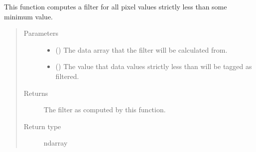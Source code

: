 \documentclass[letterpaper,10pt,english]{sphinxmanual}
\begin{document}
\begin{fulllineitems}
\label{\detokenize{docstrings/ifa_smeargle.masking.filters:ifa_smeargle.masking.filters.filter_minimum_value}}
This function computes a filter for all pixel values
strictly less than some minimum value.
\begin{quote}\begin{description}
\item[{Parameters}] \leavevmode\begin{itemize}
\item {} 
 () \textendash{} The data array that the filter will be calculated from.

\item {} 
 () \textendash{} The value that data values strictly less than will be
tagged as filtered.

\end{itemize}

\item[{Returns}] \leavevmode
{} \textendash{} The filter as computed by this function.

\item[{Return type}] \leavevmode
ndarray

\end{description}\end{quote}

\end{fulllineitems}

\end{document}
